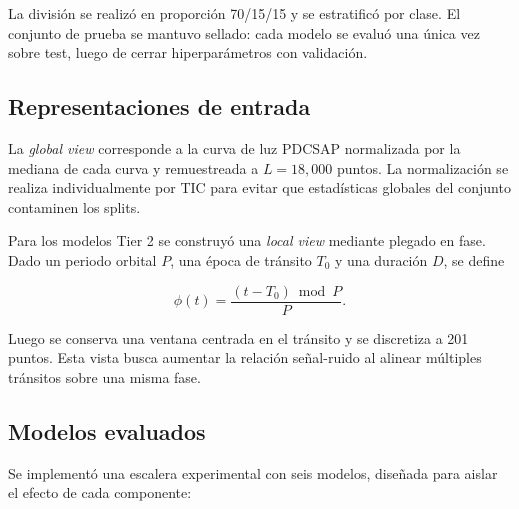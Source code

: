 \documentclass[conference]{IEEEtran}
\newcommand{\globalview}{\textit{global view}}
\newcommand{\localview}{\textit{local view}}
\begin{document}
\begin{table}[htbp]
\centering
\caption{Distribución de datos por split y subconjunto experimental.}
\label{tab:splits}
\end{table}

La división se realizó en proporción 70/15/15 y se estratificó por clase. El conjunto de prueba se mantuvo sellado: cada modelo se evaluó una única vez sobre test, luego de cerrar hiperparámetros con validación.

\subsection{Representaciones de entrada}

La \globalview{} corresponde a la curva de luz PDCSAP normalizada por la mediana de cada curva y remuestreada a $L=18,000$ puntos. La normalización se realiza individualmente por TIC para evitar que estadísticas globales del conjunto contaminen los splits.

Para los modelos Tier 2 se construyó una \localview{} mediante plegado en fase. Dado un periodo orbital $P$, una época de tránsito $T_0$ y una duración $D$, se define

\begin{equation}
\phi(t)=\frac{(t-T_0)\bmod P}{P}.
\end{equation}

Luego se conserva una ventana centrada en el tránsito y se discretiza a 201 puntos. Esta vista busca aumentar la relación señal-ruido al alinear múltiples tránsitos sobre una misma fase.

\subsection{Modelos evaluados}

Se implementó una escalera experimental con seis modelos, diseñada para aislar el efecto de cada componente:
\end{document}
